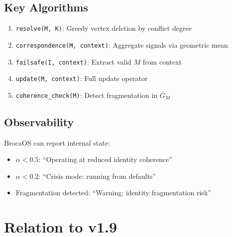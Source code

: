 \documentclass[12pt,a4paper]{article}
\theoremstyle{definition}
\begin{document}
\subsection{Key Algorithms}

\begin{enumerate}
    \item \texttt{resolve(M, K)}: Greedy vertex deletion by conflict degree
    \item \texttt{correspondence(M, context)}: Aggregate signals via geometric mean
    \item \texttt{failsafe(I, context)}: Extract valid $M$ from context
    \item \texttt{update(M, context)}: Full update operator
    \item \texttt{coherence\_check(M)}: Detect fragmentation in $\bar{G}_M$
\end{enumerate}

\subsection{Observability}

BrocaOS can report internal state:
\begin{itemize}
    \item $\alpha < 0.5$: ``Operating at reduced identity coherence''
    \item $\alpha < 0.2$: ``Crisis mode: running from defaults''
    \item Fragmentation detected: ``Warning: identity fragmentation risk''
\end{itemize}

\section{Relation to v1.9}
\end{document}
